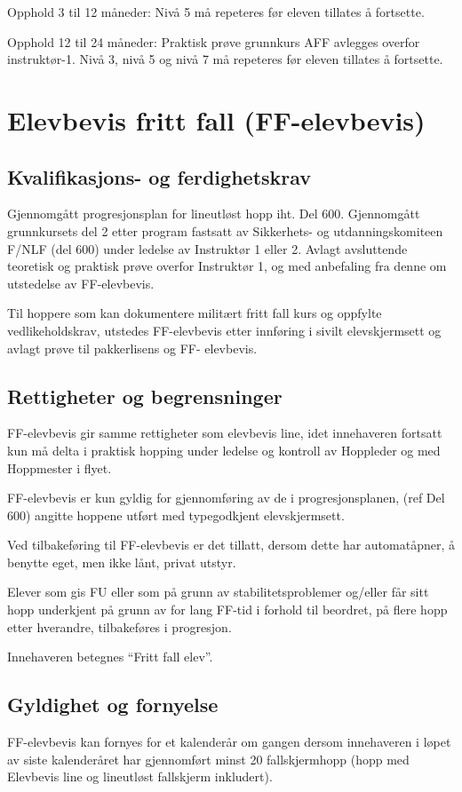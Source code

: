 Opphold 3 til 12 måneder: Nivå 5 må repeteres før eleven tillates å fortsette.

Opphold 12 til 24 måneder: Praktisk prøve grunnkurs AFF avlegges overfor instruktør-1. Nivå 3, nivå 5 og nivå 7 må repeteres før eleven tillates å fortsette.

\section{Elevbevis fritt fall (FF-elevbevis)}
\subsection{Kvalifikasjons- og ferdighetskrav}
Gjennomgått progresjonsplan for lineutløst hopp iht. Del 600. Gjennomgått grunnkursets del 2 etter program fastsatt av Sikkerhets- og utdanningskomiteen F/NLF (del 600) under ledelse av Instruktør 1 eller 2. Avlagt avsluttende teoretisk og praktisk prøve overfor Instruktør 1, og med anbefaling fra denne om utstedelse av FF-elevbevis.

Til hoppere som kan dokumentere militært fritt fall kurs og oppfylte vedlikeholdskrav, utstedes FF-elevbevis etter innføring i sivilt elevskjermsett og avlagt prøve til pakkerlisens og FF- elevbevis.

\subsection{Rettigheter og begrensninger}
FF-elevbevis gir samme rettigheter som elevbevis line, idet innehaveren fortsatt kun må delta i praktisk hopping under ledelse og kontroll av Hoppleder og med Hoppmester i flyet.

FF-elevbevis er kun gyldig for gjennomføring av de i progresjonsplanen, (ref Del 600) angitte hoppene utført med typegodkjent elevskjermsett.

Ved tilbakeføring til FF-elevbevis er det tillatt, dersom dette har automatåpner, å benytte eget, men ikke lånt, privat utstyr.

Elever som gis FU eller som på grunn av stabilitetsproblemer og/eller får sitt hopp underkjent på grunn av for lang FF-tid i forhold til beordret, på flere hopp etter hverandre, tilbakeføres i progresjon.

Innehaveren betegnes ``Fritt fall elev''.

\subsection{Gyldighet og fornyelse}
FF-elevbevis kan fornyes for et kalenderår om gangen dersom innehaveren i løpet av siste kalenderåret har gjennomført minst 20 fallskjermhopp (hopp med Elevbevis line og lineutløst fallskjerm inkludert).

